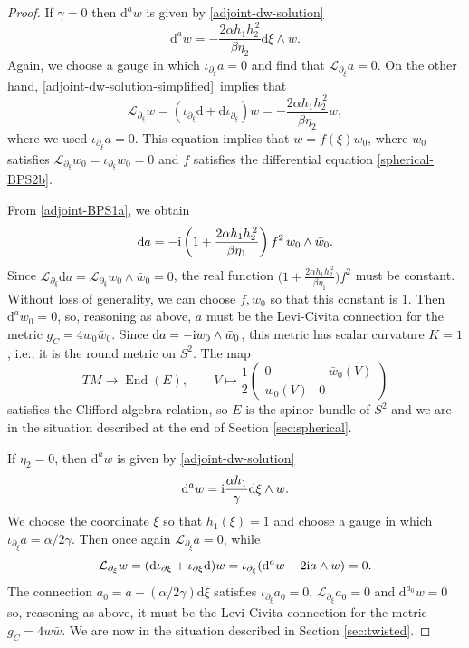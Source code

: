 \documentclass[pdftex]{sigma}
\newcommand{\1}{{\mathbb{1}}}
\newcommand{\lto}{\longrightarrow}
\def \d{\mathrm{d}}
\numberwithin{equation}{section}
\begin{document}
\begin{proof}
If $\gamma=0$ then $\d^aw$ is given by \eqref{adjoint-dw-solution}
\begin{equation}\label{adjoint-dw-solution-simplified}
\d^a w = -\frac{2\alpha h_1h_2^{\,2}}{\beta \eta_2}\d\xi\wedge w.
\end{equation}
Again, we choose a gauge in which $\iota_{\partial_\xi}a=0$ and find that $\mathcal{L}_{\partial_\xi}a=0$. On the other hand, \eqref{adjoint-dw-solution-simplified}~implies that
\begin{equation*}
\mathcal{L}_{\partial_\xi}w = (\iota_{\partial_\xi}\d + \d\iota_{\partial_\xi})w=-\frac{2\alpha h_1h_2^{\,2}}{\beta\eta_2}w,
\end{equation*}
where we used $\iota_{\partial_\xi}a=0$. This equation implies that $w=f(\xi)w_0$, where $w_0$ satisfies $\mathcal{L}_{\partial_\xi}w_0=\iota_{\partial_\xi}w_0=0$ and $f$ satisfies the differential equation \eqref{spherical-BPS2b}.

From \eqref{adjoint-BPS1a}, we obtain
\begin{equation*}
\d a = -{\rm i}\left(1+\frac{2\alpha h_1 h_2^{\,2}}{\beta\eta_1}\right)f^2\,w_0\wedge\bar{w}_0.
\end{equation*}
Since $\mathcal{L}_{\partial_\xi}\d a = \mathcal{L}_{\partial_\xi}w_0\wedge\bar{w}_0=0$, the real function $\big(1+\frac{2\alpha h_1 h_2^{\,2}}{\beta\eta_1}\big)f^2$ must be constant. Without loss of generality, we can choose $f,w_0$ so that this constant is 1. Then $\d^a w_0=0$, so, reasoning as above, $a$ must be the Levi-Civita connection for the metric $g_C=4w_0\bar{w}_0$. Since $\d a=-{\rm i}w_0\wedge\bar{w}_0$, this metric has scalar curvature $K=1$, i.e., it is the round metric on $S^2$. The map
\begin{equation*}
TM\lto \operatorname{End}(E), \qquad V\mapsto \frac12\begin{pmatrix}0&-\bar{w}_0(V)\\w_0(V)&0\end{pmatrix}
\end{equation*}
satisfies the Clifford algebra relation, so $E$ is the spinor bundle of $S^2$ and we are in the situation described at the end of Section \ref{sec:spherical}.

If $\eta_2=0$, then $\d^aw$ is given by \eqref{adjoint-dw-solution}
\begin{equation}\label{adjoint-dw-solution-simplified2}
\d^a w = {\rm i}\frac{\alpha h_1}{\gamma}\d\xi\wedge w.
\end{equation}
We choose the coordinate $\xi$ so that $h_1(\xi)=1$ and choose a gauge in which $\iota_{\partial_\xi}a=\alpha /2\gamma$. Then once again $\mathcal{L}_{\partial_\xi}a=0$, while
\begin{equation*}
\mathcal{L}_{\partial_\xi}w = (\d\iota_{\partial\xi}+\iota_{\partial\xi}\d)w = \iota_{\partial_\xi}(\d^aw - 2{\rm i}a\wedge w) = 0.
\end{equation*}
The connection $a_0=a-(\alpha/2\gamma)\d\xi$ satisfies $\iota_{\partial_\xi} a_0=0$, $\mathcal{L}_{\partial_\xi}a_0=0$ and $\d^{a_0}w=0$ so, reasoning as above, it must be the Levi-Civita connection for the metric $g_C=4w\bar{w}$. We are now in the situation described in Section \ref{sec:twisted}.


\end{proof}
\end{document}
